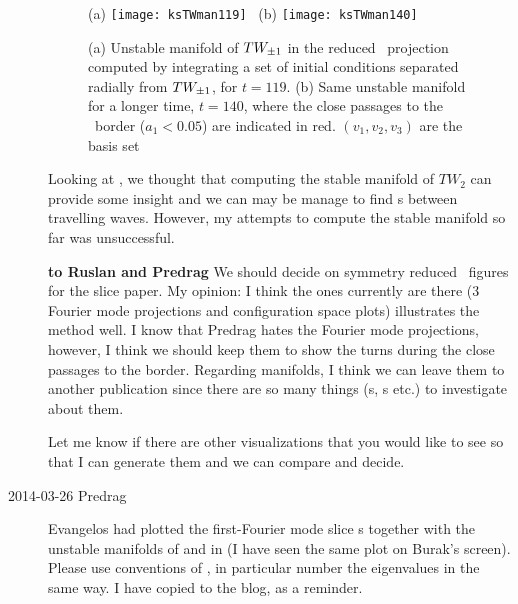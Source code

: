 \begin{description}
\begin{figure}
\begin{center}
 {(a)} \texttt{[image: ksTWman119]} \,
 {(b)} \texttt{[image: ksTWman140]}
\end{center}
\caption{ (a) Unstable manifold of $TW_{\pm1}$ in the
reduced \statesp\ projection computed
by integrating a set of initial
conditions  separated radially
from $TW_{\pm1}$, for $t=119$.
(b) Same unstable manifold for
a longer time, $t=140$, where the close passages to the \slicePlane\
border ($a_1 < 0.05$) are indicated in red.
$(v_1, v_2, v_3)$ are the basis set 
}
\label{f-ksTWman119140}
\end{figure}

Looking at , we thought that computing the stable
manifold of $TW_2$ can provide some insight and we can may be manage to find
\hec s between travelling waves. However, my attempts to
compute the stable manifold so far was unsuccessful.

{\bf to Ruslan and Predrag} We should decide on symmetry reduced \KS\ figures
for the slice paper.
My opinion: I think the ones currently are there (3 Fourier mode projections
and configuration space plots) illustrates the method well. I know that Predrag
hates the Fourier mode projections, however, I think we should keep them to
show the turns during the close passages to the border. Regarding manifolds,
I think we can leave them to another publication since there are so many
things (\hec s, \PoincSec s etc.) to investigate
about them.

Let me know if there are other visualizations that you would like to see
so that I can generate them and we can compare and decide.

\item[2014-03-26 Predrag]
Evangelos had plotted the first-Fourier mode slice \rpo s together with
the unstable manifolds of \REQV{\pm}{1} and \EQV{2} in
 (I have seen the same
plot on Burak's screen). Please use conventions of , in
particular number the eigenvalues in the same way. I have copied
\reftab{tab:Eksym} to the blog, as a reminder.


\end{description}
